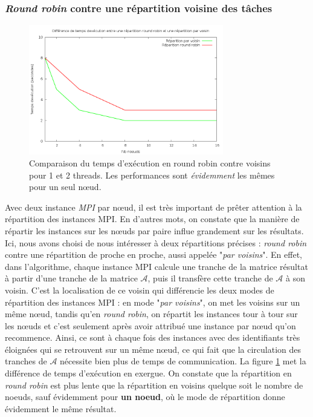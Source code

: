 \documentclass[	DIV=calc,%
							paper=a4,%
							fontsize=11pt,%
							twocolumn]{scrartcl}	 					%
\begin{document}
\subsubsection*{\textit{Round robin} contre une répartition voisine des tâches}
\begin{figure}
\includegraphics[keepaspectratio,width=8.5cm]{img/rr_v.png} 
\caption{Comparaison du temps d'exécution en round robin contre voisins pour 1 et 2 threads. Les performances sont \textit{évidemment} les mêmes pour un seul nœud.}
\label{fig:rr_v}
\end{figure}
Avec deux instance \textit{MPI} par nœud, il est très important de prêter attention à la répartition des instances MPI. En d'autres mots, on constate que la manière de répartir les instances sur les nœuds par paire influe grandement sur les résultats.\newline
Ici, nous avons choisi de nous intéresser à deux répartitions précises : \textit{round robin} contre une répartition de proche en proche, aussi appelée "\textit{par voisins}".\newline
En effet, dans l'algorithme, chaque instance MPI calcule une tranche de la matrice résultat à partir d'une tranche de la matrice $ \mathcal{A} $, puis il transfère cette tranche de $ \mathcal{A} $  à son voisin. C'est la localisation de ce voisin qui différencie les deux modes de répartition des instances MPI : en mode "\textit{par voisins}", on met les voisins sur un même nœud, tandis qu'en \textit{round robin}, on répartit les instances tour à tour sur les nœuds et c'est seulement après avoir attribué une instance par nœud qu'on recommence. Ainsi, ce sont à chaque fois des instances avec des identifiants très éloignées qui se retrouvent sur un  même nœud, ce qui fait que la circulation des tranches de $ \mathcal{A} $ nécessite bien plus de temps de communication.\newline
La figure \ref{fig:rr_v} met la différence de temps d'exécution en exergue. On constate que la répartition en \textit{round robin} est plus lente que la répartition en voisins quelque soit le nombre de noeuds, sauf évidemment pour \textbf{un noeud}, où le mode de répartition donne évidemment le même résultat.
\end{document}
